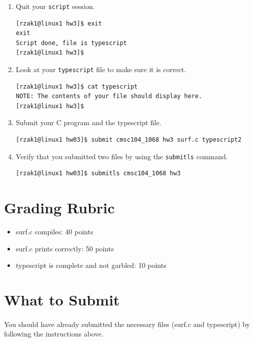 \documentclass[letter,11pt]{article}
\begin{document}
\begin{enumerate}
\begin{verbatim}
[rzak1@linux1 hw3]$ ./a.out
    \end{verbatim}
    \item Quit your \texttt{script} session.
    \begin{verbatim}
[rzak1@linux1 hw3]$ exit
exit
Script done, file is typescript
[rzak1@linux1 hw3]$
    \end{verbatim}
    \item Look at your \texttt{typescript} file to make sure it is correct.
    \begin{verbatim}
[rzak1@linux1 hw3]$ cat typescript
NOTE: The contents of your file should display here.
[rzak1@linux1 hw3]$ 
    \end{verbatim}
    \item Submit your C program and the typescript file.
    \begin{verbatim}
[rzak1@linux1 hw03]$ submit cmsc104_1068 hw3 surf.c typescript2
    \end{verbatim}
    \item Verify that you submitted two files by using the \texttt{submitls} command.
    \begin{verbatim}
[rzak1@linux1 hw03]$ submitls cmsc104_1068 hw3
    \end{verbatim}
\end{enumerate}

\section*{Grading Rubric}
\begin{itemize}
    \item surf.c compiles: 40 points
    \item surf.c prints correctly: 50 points
    \item typescript is complete and not garbled: 10 points
\end{itemize}

\section*{What to Submit}
\paragraph{}You should have already submitted the necessary files (surf.c and typescript) by following the instructions above.
\end{document}
